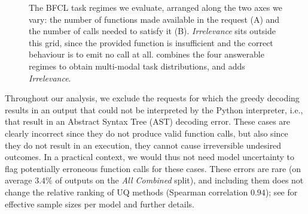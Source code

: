 \begin{figure}[h!]
\centering
{}
\caption{The BFCL task regimes we evaluate, arranged along the two axes we vary: the number of functions made available in the request (A) and the number of calls needed to satisfy it (B). \emph{Irrelevance} sits outside this grid, since the provided function is insufficient and the correct behaviour is to emit no call at all.  combines the four answerable regimes to obtain multi-modal task distributions, and  adds \emph{Irrelevance}.}
\label{fig:regimes}
\end{figure}

Throughout our analysis, we exclude the requests for which the greedy decoding results in an output that could not be interpreted by the Python interpreter, i.e., that result in an Abstract Syntax Tree (AST) decoding error.
These cases are clearly incorrect since they do not produce valid function calls, but also since they do not result in an execution, they cannot cause irreversible undesired outcomes.
In a practical context, we would thus not need model uncertainty to flag potentially erroneous function calls for these cases.
These errors are rare (on average $3.4\%$ of outputs on the \emph{All Combined} split), and including them does not change the relative ranking of UQ methods (Spearman correlation $0.94$); see  for effective sample sizes per model and further details.

